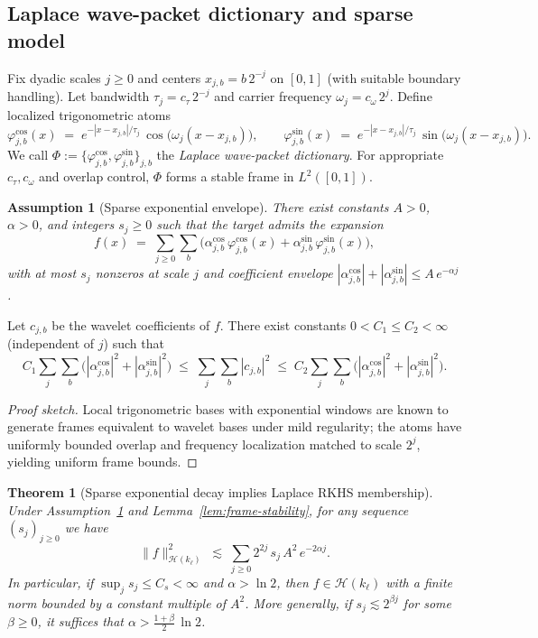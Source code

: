\documentclass[11pt]{article}
\newtheorem{assumption}{Assumption}
\newtheorem{theorem}{Theorem}
\theoremstyle{remark}
\begin{document}
\subsection{Laplace wave-packet dictionary and sparse model}
Fix dyadic scales $j\ge 0$ and centers $x_{j,b}=b\,2^{-j}$ on $[0,1]$ (with suitable boundary handling). Let bandwidth $\tau_j = c_\tau\,2^{-j}$ and carrier frequency $\omega_j = c_\omega\,2^{j}$. Define localized trigonometric atoms
\[
\varphi^{\cos}_{j,b}(x) \;=\; e^{-|x - x_{j,b}|/\tau_j}\, \cos\big(\omega_j (x - x_{j,b})\big), 
\qquad
\varphi^{\sin}_{j,b}(x) \;=\; e^{-|x - x_{j,b}|/\tau_j}\, \sin\big(\omega_j (x - x_{j,b})\big).
\]
We call $\Phi := \{\varphi^{\cos}_{j,b}, \varphi^{\sin}_{j,b}\}_{j,b}$ the \emph{Laplace wave-packet dictionary}. For appropriate $c_\tau,c_\omega$ and overlap control, $\Phi$ forms a stable frame in $L^2([0,1])$.

\begin{assumption}[Sparse exponential envelope]\label{ass:exp-sparse}
There exist constants $A>0$, $\alpha>0$, and integers $s_j \ge 0$ such that the target admits the expansion
\[
f(x) \;=\; \sum_{j\ge 0} \sum_{b} \big(\alpha^{\cos}_{j,b}\, \varphi^{\cos}_{j,b}(x) + \alpha^{\sin}_{j,b}\, \varphi^{\sin}_{j,b}(x)\big),
\]
with at most $s_j$ nonzeros at scale $j$ and coefficient envelope
$|\alpha^{\cos}_{j,b}| + |\alpha^{\sin}_{j,b}| \le A\, e^{-\alpha j}$.
\end{assumption}

\begin{lemma}\label{lem:frame-stability}
Let $c_{j,b}$ be the wavelet coefficients of $f$. There exist constants $0<C_1\le C_2<\infty$ (independent of $j$) such that
\[
C_1 \sum_{j} \sum_b \big(|\alpha^{\cos}_{j,b}|^2 + |\alpha^{\sin}_{j,b}|^2\big)
\;\le\; \sum_j \sum_b |c_{j,b}|^2 \;\le\;
C_2 \sum_{j} \sum_b \big(|\alpha^{\cos}_{j,b}|^2 + |\alpha^{\sin}_{j,b}|^2\big).
\]
\end{lemma}

\begin{proof}[Proof sketch]
Local trigonometric bases with exponential windows are known to generate frames equivalent to wavelet bases under mild regularity; the atoms have uniformly bounded overlap and frequency localization matched to scale $2^{j}$, yielding uniform frame bounds.
\end{proof}

\begin{theorem}[Sparse exponential decay implies Laplace RKHS membership]\label{thm:laplace-membership}
Under Assumption~\ref{ass:exp-sparse} and Lemma~\ref{lem:frame-stability}, for any sequence $(s_j)_{j\ge 0}$ we have
\[
\|f\|_{\mathcal{H}(k_\ell)}^2 \;\lesssim\; \sum_{j\ge 0} 2^{2j}\, s_j\, A^2\, e^{-2\alpha j}.
\]
In particular, if $\sup_j s_j \le C_s < \infty$ and $\alpha > \ln 2$, then $f \in \mathcal{H}(k_\ell)$ with a finite norm bounded by a constant multiple of $A^2$. More generally, if $s_j \lesssim 2^{\beta j}$ for some $\beta \ge 0$, it suffices that $\alpha > \tfrac{1+\beta}{2}\,\ln 2$.
\end{theorem}
\end{document}
